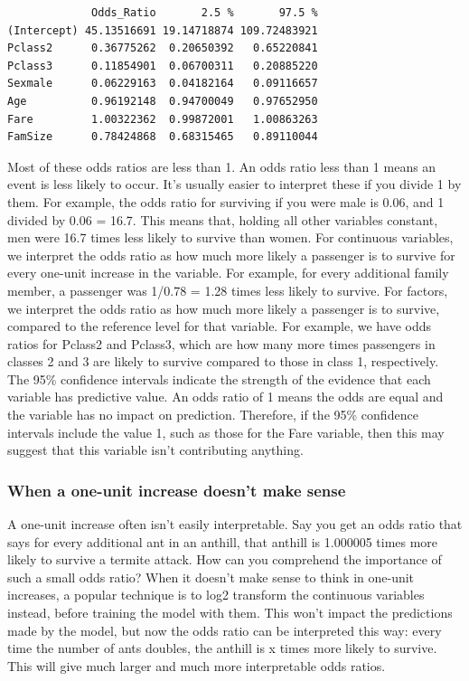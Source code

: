 \documentclass[
]{article}
\begin{document}
\begin{verbatim}
             Odds_Ratio       2.5 %       97.5 %
(Intercept) 45.13516691 19.14718874 109.72483921
Pclass2      0.36775262  0.20650392   0.65220841
Pclass3      0.11854901  0.06700311   0.20885220
Sexmale      0.06229163  0.04182164   0.09116657
Age          0.96192148  0.94700049   0.97652950
Fare         1.00322362  0.99872001   1.00863263
FamSize      0.78424868  0.68315465   0.89110044
\end{verbatim}

Most of these odds ratios are less than 1. An odds ratio less than 1
means an event is less likely to occur. It's usually easier to interpret
these if you divide 1 by them. For example, the odds ratio for surviving
if you were male is 0.06, and 1 divided by 0.06 = 16.7. This means that,
holding all other variables constant, men were 16.7 times less likely to
survive than women. For continuous variables, we interpret the odds
ratio as how much more likely a passenger is to survive for every
one-unit increase in the variable. For example, for every additional
family member, a passenger was 1/0.78 = 1.28 times less likely to
survive. For factors, we interpret the odds ratio as how much more
likely a passenger is to survive, compared to the reference level for
that variable. For example, we have odds ratios for Pclass2 and Pclass3,
which are how many more times passengers in classes 2 and 3 are likely
to survive compared to those in class 1, respectively. The 95\%
confidence intervals indicate the strength of the evidence that each
variable has predictive value. An odds ratio of 1 means the odds are
equal and the variable has no impact on prediction. Therefore, if the
95\% confidence intervals include the value 1, such as those for the
Fare variable, then this may suggest that this variable isn't
contributing anything.

\subsubsection{When a one-unit increase doesn't make
sense}\label{when-a-one-unit-increase-doesnt-make-sense}

A one-unit increase often isn't easily interpretable. Say you get an
odds ratio that says for every additional ant in an anthill, that
anthill is 1.000005 times more likely to survive a termite attack. How
can you comprehend the importance of such a small odds ratio? When it
doesn't make sense to think in one-unit increases, a popular technique
is to log2 transform the continuous variables instead, before training
the model with them. This won't impact the predictions made by the
model, but now the odds ratio can be interpreted this way: every time
the number of ants doubles, the anthill is x times more likely to
survive. This will give much larger and much more interpretable odds
ratios.
\end{document}

